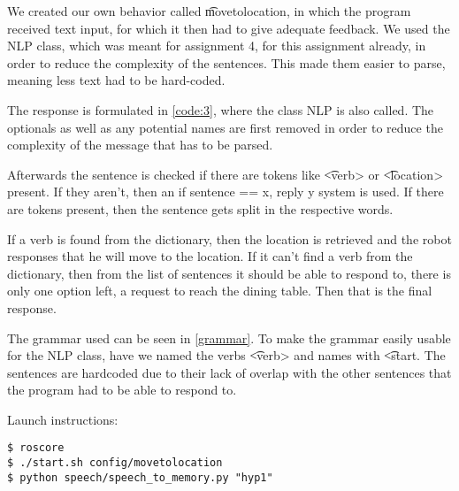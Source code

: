 
We created our own behavior called \t{movetolocation}, in which the program received text input, for which it then had to give adequate feedback. We used the NLP class, which was meant for assignment 4, for this assignment already, in order to reduce the complexity of the sentences. This made them easier to parse, meaning less text had to be hard-coded.



The response is formulated in \cref{code:3}, where the class NLP is also called. The optionals as well as any potential names are first removed in order to reduce the complexity of the message that has to be parsed. 

Afterwards the sentence is checked if there are tokens like \t{<verb>} or \t{<location>} present. If they aren't, then an if sentence == x, reply y system is used. If there are tokens present, then the sentence gets split in the respective words. 

If a verb is found from the dictionary, then the location is retrieved and the robot responses that he will move to the location. If it can't find a verb from the dictionary, then from the list of sentences it should be able to respond to, there is only one option left, a request to reach the dining table. Then that is the final response.



The grammar used can be seen in \cref{grammar}. To make the grammar easily usable for the NLP class, have we named the verbs \t{<verb>} and names with \t{<start}. The sentences are hardcoded due to their lack of overlap with the other sentences that the program had to be able to respond to.

Launch instructions:
\begin{lstlisting}
$ roscore
$ ./start.sh config/movetolocation
$ python speech/speech_to_memory.py "hyp1"
\end{lstlisting}